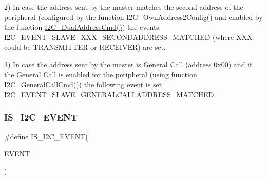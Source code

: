 2) In case the address sent by the master matches the second address of the peripheral (configured by the function \mbox{\hyperlink{group___i2_c_ga7be2cc634a613c8e3539137e897a22df}{I2\+C\+\_\+\+Own\+Address2\+Config()}} and enabled by the function \mbox{\hyperlink{group___i2_c_ga02145a333a56e79557d6ef4ea03fc313}{I2\+C\+\_\+\+Dual\+Address\+Cmd()}}) the events I2\+C\+\_\+\+E\+V\+E\+N\+T\+\_\+\+S\+L\+A\+V\+E\+\_\+\+X\+X\+X\+\_\+\+S\+E\+C\+O\+N\+D\+A\+D\+D\+R\+E\+S\+S\+\_\+\+M\+A\+T\+C\+H\+ED (where X\+XX could be T\+R\+A\+N\+S\+M\+I\+T\+T\+ER or R\+E\+C\+E\+I\+V\+ER) are set.

3) In case the address sent by the master is General Call (address 0x00) and if the General Call is enabled for the peripheral (using function \mbox{\hyperlink{group___i2_c_ga65c740fc8d7b3b9f15cc432d8699d471}{I2\+C\+\_\+\+General\+Call\+Cmd()}}) the following event is set I2\+C\+\_\+\+E\+V\+E\+N\+T\+\_\+\+S\+L\+A\+V\+E\+\_\+\+G\+E\+N\+E\+R\+A\+L\+C\+A\+L\+L\+A\+D\+D\+R\+E\+S\+S\+\_\+\+M\+A\+T\+C\+H\+ED. \mbox{\label{group___i2_c___events_ga4b42e6936006195f89ff4f763d366970}} 
\subsubsection{\texorpdfstring{I\+S\+\_\+\+I2\+C\+\_\+\+E\+V\+E\+NT}{IS\_I2C\_EVENT}}
{\footnotesize\ttfamily \#define I\+S\+\_\+\+I2\+C\+\_\+\+E\+V\+E\+NT(\begin{DoxyParamCaption}\item[{}]{E\+V\+E\+NT }\end{DoxyParamCaption})}

